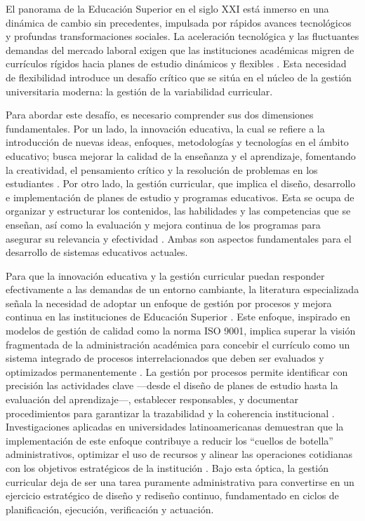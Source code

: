 \introduction

El panorama de la Educación Superior en el siglo XXI está inmerso en una dinámica de cambio sin 
precedentes, impulsada por rápidos avances tecnológicos y profundas transformaciones sociales. 
La aceleración tecnológica y las fluctuantes demandas del mercado laboral exigen que las instituciones
académicas migren de currículos rígidos hacia planes de estudio dinámicos y
flexibles \citep{unesco2022}. Esta necesidad de flexibilidad introduce un desafío
crítico que se sitúa en el núcleo de la gestión universitaria moderna: 
la gestión de la variabilidad curricular.

Para abordar este desafío, es necesario comprender sus dos dimensiones fundamentales. 
Por un lado, la innovación educativa, la cual se refiere a la introducción de nuevas ideas, enfoques, 
metodologías y tecnologías en el ámbito educativo; busca mejorar la calidad de la enseñanza y 
el aprendizaje, fomentando la creatividad, el pensamiento crítico y la resolución de problemas 
en los estudiantes \citep{gomez2023}. Por otro lado, la gestión curricular, que implica el diseño, 
desarrollo e implementación de planes de estudio y programas educativos. Esta se ocupa de 
organizar y estructurar los contenidos, las habilidades y las competencias que se enseñan, 
así como la evaluación y mejora continua de los programas para asegurar su relevancia y 
efectividad \citep{gomez2023}. Ambas son aspectos fundamentales para el desarrollo de sistemas 
educativos actuales.

Para que la innovación educativa y la gestión curricular puedan responder efectivamente a 
las demandas de un entorno cambiante, la literatura especializada señala la necesidad de 
adoptar un enfoque de gestión por procesos y mejora continua en las instituciones de Educación 
Superior \citep{delaguila2014}. Este enfoque, inspirado en modelos de gestión de calidad como la norma ISO 9001, 
implica superar la visión fragmentada de la administración académica para concebir el currículo 
como un sistema integrado de procesos interrelacionados que deben ser evaluados y optimizados 
permanentemente \citep{soto2022}. La gestión por procesos permite identificar con precisión las actividades
clave —desde el diseño de planes de estudio hasta la evaluación del aprendizaje—, establecer 
responsables, y documentar procedimientos para garantizar la trazabilidad y la coherencia 
institucional \citep{veiga2024}. Investigaciones aplicadas en universidades latinoamericanas demuestran que la 
implementación de este enfoque contribuye a reducir los ``cuellos de botella'' administrativos, 
optimizar el uso de recursos y alinear las operaciones cotidianas con los objetivos estratégicos 
de la institución \citep{gutama2025}. Bajo esta óptica, la gestión curricular deja de ser una tarea puramente 
administrativa para convertirse en un ejercicio estratégico de diseño y rediseño continuo, 
fundamentado en ciclos de planificación, ejecución, verificación y actuación. 

